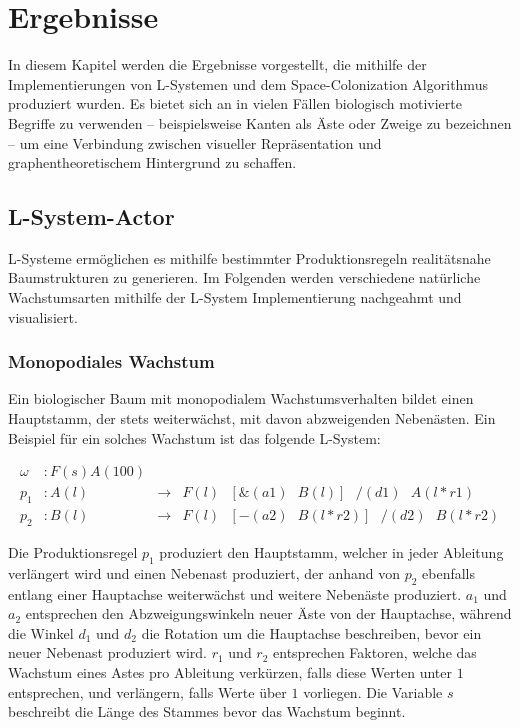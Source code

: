 \chapter{Ergebnisse}
In diesem Kapitel werden die Ergebnisse vorgestellt, die mithilfe der Implementierungen von L-Systemen und dem Space-Colonization Algorithmus produziert wurden. Es bietet sich an in vielen Fällen biologisch motivierte Begriffe zu verwenden -- beispielsweise Kanten als Äste oder Zweige zu bezeichnen -- um eine Verbindung zwischen visueller Repräsentation und graphentheoretischem Hintergrund zu schaffen.

\section{L-System-Actor}
L-Systeme ermöglichen es mithilfe bestimmter Produktionsregeln realitätsnahe Baumstrukturen zu generieren. Im Folgenden werden verschiedene natürliche Wachstumsarten mithilfe der L-System Implementierung nachgeahmt und visualisiert.
\subsection{Monopodiales Wachstum}
Ein biologischer Baum mit monopodialem Wachstumsverhalten bildet einen Hauptstamm, der stets weiterwächst, mit davon abzweigenden Nebenästen. \cite[S.14]{Deussen:05} Ein Beispiel für ein solches Wachstum ist das folgende L-System:

\begin{equation}
\begin{array}{llll}
\omega & : F(s)A(100) \\
p_1 & : A(l) &\rightarrow& F(l)\text{ }[\&(a1)\text{ }B(l)]\text{ }/(d1)\text{ }A(l*r1) \\
p_2 &  : B(l) &\rightarrow& F(l)\text{ }[-(a2)\text{ }B(l*r2)]\text{ }/(d2)\text{ }B(l*r2)
\end{array}
\label{eq:ProdMonopodial}
\end{equation} 
\cite[S.56]{ABOP:04}

Die Produktionsregel $p_1$ produziert den Hauptstamm, welcher in jeder Ableitung verlängert wird und einen Nebenast produziert, der anhand von $p_2$ ebenfalls entlang einer Hauptachse weiterwächst und weitere Nebenäste produziert. $a_1$ und $a_2$ entsprechen den Abzweigungswinkeln neuer Äste von der Hauptachse, während die Winkel $d_1$ und $d_2$ die Rotation um die Hauptachse beschreiben, bevor ein neuer Nebenast produziert wird. $r_1$ und $r_2$ entsprechen Faktoren, welche das Wachstum eines Astes pro Ableitung verkürzen, falls diese Werten unter $1$ entsprechen, und verlängern, falls Werte über $1$ vorliegen. Die Variable $s$ beschreibt die Länge des Stammes bevor das Wachstum beginnt. \cite[S.57]{ABOP:04}

